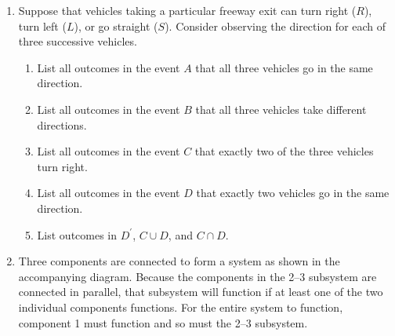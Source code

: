 \documentclass[letterpaper,12pt]{article}
\begin{document}
\begin{enumerate}
\begin{enumerate}
\begin{align*}
\begin{array}{l}
            2134, 2143, 2314, 2341, 2413, 2431, \\
            1234, 1243, 3214, 3241, 4213, 4231, \\
            1324, 1342, 1423, 1432
          \end{array}\right\} \\
          A \cap B &= \Set{1234, 1243} \\
          A^\prime &=
          \left\{\begin{array}{l}
            2134, 2143, 2314, 2341, 2413, 2431, \\
            3124, 3142, 3214, 3241, 3412, 3421, \\
            4123, 4132, 4213, 4231, 4312, 4321
          \end{array}\right\}
        \end{align*}
    \end{enumerate}
  \item[2.]
    Suppose that vehicles taking a particular freeway exit can turn right ($R$), turn left ($L$), or go straight ($S$). Consider observing the direction for each of three successive vehicles.
    \begin{enumerate}
      \item[a.]
        List all outcomes in the event $A$ that all three vehicles go in the same direction.
      \item[b.]
        List all outcomes in the event $B$ that all three vehicles take different directions.
      \item[c.]
        List all outcomes in the event $C$ that exactly two of the three vehicles turn right.
      \item[d.]
        List all outcomes in the event $D$ that exactly two vehicles go in the same direction.
      \item[e.]
        List outcomes in $D^\prime$, $C \cup D$, and $C \cap D$.
    \end{enumerate}
  \item[3.]
    Three components are connected to form a system as shown in the accompanying diagram. Because the components in the 2–3 subsystem are connected in parallel, that subsystem will function if at least one of the two individual components functions. For the entire system to function, component 1 must function and so must the 2–3 subsystem.
    \begin{center}
\end{center}
\end{enumerate}
\end{document}

